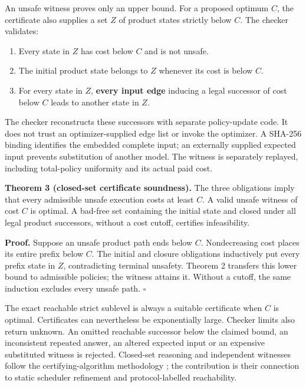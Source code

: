 An unsafe witness proves only an upper bound. For a proposed optimum
\(C\), the certificate also supplies a set \(Z\) of product states
strictly below \(C\). The checker validates:

\begin{enumerate}
\def\labelenumi{\arabic{enumi}.}
\tightlist
\item
  Every state in \(Z\) has cost below \(C\) and is not unsafe.
\item
  The initial product state belongs to \(Z\) whenever its cost is below
  \(C\).
\item
  For every state in \(Z\), \textbf{every input edge} inducing a legal
  successor of cost below \(C\) leads to another state in \(Z\).
\end{enumerate}

The checker reconstructs these successors with separate policy-update
code. It does not trust an optimizer-supplied edge list or invoke the
optimizer. A SHA-256 binding identifies the embedded complete input; an
externally supplied expected input prevents substitution of another
model. The witness is separately replayed, including total-policy
uniformity and its actual paid cost.

\textbf{Theorem 3 (closed-set certificate soundness).} The three
obligations imply that every admissible unsafe execution costs at least
\(C\). A valid unsafe witness of cost \(C\) is optimal. A bad-free set
containing the initial state and closed under all legal product
successors, without a cost cutoff, certifies infeasibility.

\textbf{Proof.} Suppose an unsafe product path ends below \(C\).
Nondecreasing cost places its entire prefix below \(C\). The initial and
closure obligations inductively put every prefix state in \(Z\),
contradicting terminal unsafety. Theorem 2 transfers this lower bound to
admissible policies; the witness attains it. Without a cutoff, the same
induction excludes every unsafe path. \(\square\)

The exact reachable strict sublevel is always a suitable certificate
when \(C\) is optimal. Certificates can nevertheless be exponentially
large. Checker limits also return unknown. An omitted reachable
successor below the claimed bound, an inconsistent repeated answer, an
altered expected input or an expensive substituted witness is rejected.
Closed-set reasoning and independent witnesses follow the
certifying-algorithm methodology \cite{mcconnell2011certifying}; the
contribution is their connection to static scheduler refinement and
protocol-labelled reachability.

